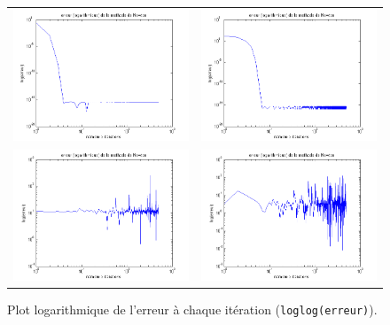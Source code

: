 \begin{figure}
\centering
\begin{tabular}{cc}
\includegraphics[width = 8cm]{erreur2.png} & \includegraphics[width = 8cm]{erreur5.png}\\
\includegraphics[width = 8cm]{erreur.png} & \includegraphics[width = 8cm]{erreur4.png}\\
\end{tabular}
\caption{Plot logarithmique de l'erreur à chaque itération (\texttt{loglog(erreur)}). }
\label{plor_erreur}
\end{figure}




